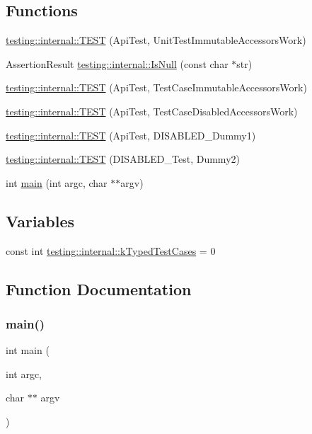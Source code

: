\subsection*{Functions}
\begin{DoxyCompactItemize}
\item 
\mbox{\hyperlink{namespacetesting_1_1internal_a9ac879683abb06d1c0bba3a339ea2f40}{testing\+::internal\+::\+T\+E\+ST}} (Api\+Test, Unit\+Test\+Immutable\+Accessors\+Work)
\item 
Assertion\+Result \mbox{\hyperlink{namespacetesting_1_1internal_adcfd37a66bc4cb0e8291cf46e1a6c72b}{testing\+::internal\+::\+Is\+Null}} (const char $\ast$str)
\item 
\mbox{\hyperlink{namespacetesting_1_1internal_a33809333fe5b5f33c2bd56ddcdd1dbb6}{testing\+::internal\+::\+T\+E\+ST}} (Api\+Test, Test\+Case\+Immutable\+Accessors\+Work)
\item 
\mbox{\hyperlink{namespacetesting_1_1internal_a459d693357db8f8f48c26a8bee3ffb84}{testing\+::internal\+::\+T\+E\+ST}} (Api\+Test, Test\+Case\+Disabled\+Accessors\+Work)
\item 
\mbox{\hyperlink{namespacetesting_1_1internal_a9ed5f89c92532506899e3908e79af4de}{testing\+::internal\+::\+T\+E\+ST}} (Api\+Test, D\+I\+S\+A\+B\+L\+E\+D\+\_\+\+Dummy1)
\item 
\mbox{\hyperlink{namespacetesting_1_1internal_a4a84433419426d1c1b87ce998267b0d4}{testing\+::internal\+::\+T\+E\+ST}} (D\+I\+S\+A\+B\+L\+E\+D\+\_\+\+Test, Dummy2)
\item 
int \mbox{\hyperlink{_obj__test_2lib_2googletest-release-1_88_81_2googletest_2test_2gtest-unittest-api__test_8cc_a3c04138a5bfe5d72780bb7e82a18e627}{main}} (int argc, char $\ast$$\ast$argv)
\end{DoxyCompactItemize}
\subsection*{Variables}
\begin{DoxyCompactItemize}
\item 
const int \mbox{\hyperlink{namespacetesting_1_1internal_a685ea5332074ae63b0ded2b184ac2271}{testing\+::internal\+::k\+Typed\+Test\+Cases}} = 0
\end{DoxyCompactItemize}


\subsection{Function Documentation}
\mbox{\label{_obj__test_2lib_2googletest-release-1_88_81_2googletest_2test_2gtest-unittest-api__test_8cc_a3c04138a5bfe5d72780bb7e82a18e627}} 
\subsubsection{\texorpdfstring{main()}{main()}}
{\footnotesize\ttfamily int main (\begin{DoxyParamCaption}\item[{int}]{argc,  }\item[{char $\ast$$\ast$}]{argv }\end{DoxyParamCaption})}

